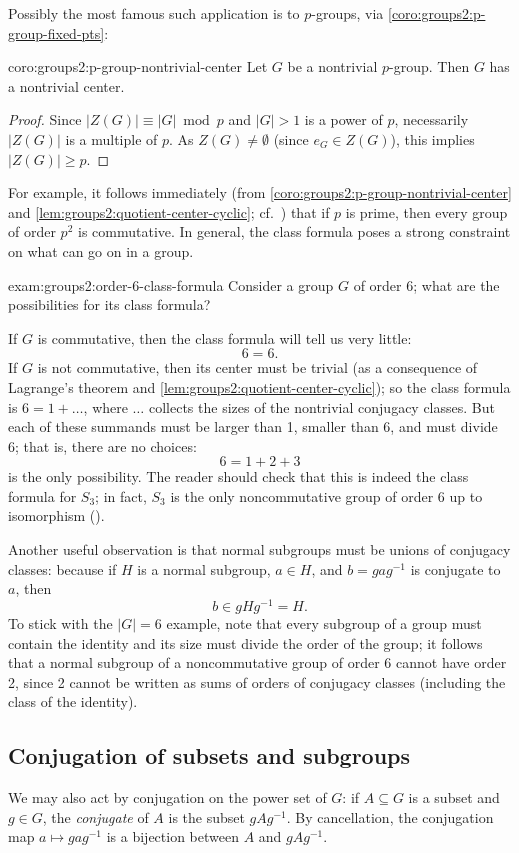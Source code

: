 Possibly the most famous such application is to $p$-groups, via
\cref{coro:groups2:p-group-fixed-pts}:
\begin{coro}{}{coro:groups2:p-group-nontrivial-center}
  Let $G$ be a nontrivial $p$-group. Then $G$ has a nontrivial center.
\end{coro}
\begin{proof}
  Since $|Z(G)| \equiv |G| \bmod p$ and $|G| > 1$ is a power of $p$,
  necessarily $|Z(G)|$ is a multiple of $p$. As $Z(G) \neq \emptyset$
  (since $e_G \in Z(G)$), this implies $|Z(G)| \geq p$.
\end{proof}
For example, it follows immediately (from
\cref{coro:groups2:p-group-nontrivial-center} and
\cref{lem:groups2:quotient-center-cyclic}; cf.\
) that if $p$ is
prime, then every group of order $p^2$ is commutative. In general, the
class formula poses a strong constraint on what can go on in a group.
\begin{exam}{}{exam:groups2:order-6-class-formula}
  Consider a group $G$ of order 6; what are the possibilities for its
  class formula?

  If $G$ is commutative, then the class formula will tell us very
  little:
  \[
    6 = 6.
  \]
  If $G$ is not commutative, then its center must be trivial (as a
  consequence of Lagrange's theorem and
  \cref{lem:groups2:quotient-center-cyclic}); so the class formula is
  $6 = 1 + \dots$, where $\dots$ collects the sizes of the nontrivial
  conjugacy classes. But each of these summands must be larger than 1,
  smaller than 6, and must divide 6; that is, there are no choices:
  \[
    6 = 1 + 2 + 3
  \]
  is the only possibility. The reader should check that this is indeed
  the class formula for $S_3$; in fact, $S_3$ is the only
  noncommutative group of order 6 up to isomorphism
  ().
\end{exam}
Another useful observation is that normal subgroups must be unions of
conjugacy classes: because if $H$ is a normal subgroup, $a \in H$, and
$b = gag^{-1}$ is conjugate to $a$, then
\[
  b \in gHg^{-1} = H.
\]
To stick with the $|G| = 6$ example, note that every subgroup of a
group must contain the identity and its size must divide the order of
the group; it follows that a normal subgroup of a noncommutative group
of order 6 cannot have order 2, since 2 cannot be written as sums of
orders of conjugacy classes (including the class of the identity).

\subsection{Conjugation of subsets and subgroups}
\label{subsec:groups2:conjugation-of-subsets-and-subgroups}
We may also act by conjugation on the power set of $G$: if
$A \subseteq G$ is a subset and $g \in G$, the \emph{conjugate} of $A$
is the subset $gAg^{-1}$.  By cancellation, the conjugation map
$a \mapsto gag^{-1}$ is a bijection between $A$ and $gAg^{-1}$.

